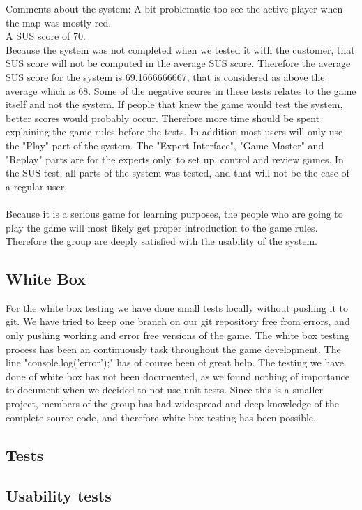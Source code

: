 Comments about the system: A bit problematic too see the active player when the map was mostly red.\\
A SUS score of 70.\\

Because the system was not completed when we tested it with the customer, that SUS score will not be computed in the average SUS score. Therefore the average SUS score for the system is 69.1666666667, that is considered as above the average which is 68. Some of the negative scores in these tests relates to the game itself and not the system. If people that knew the game would test the system, better scores would probably occur. Therefore more time should be spent explaining the game rules before the tests. In addition most users will only use the "Play" part of the system. The "Expert Interface", "Game Master" and "Replay" parts are for the experts only, to set up, control and review games. In the SUS test, all parts of the system was tested, and that will not be the case of a regular user.\\
\\
Because it is a serious game for learning purposes, the people who are going to play the game will most likely get proper introduction to the game rules. Therefore the group are deeply satisfied with the usability of the system. 
\subsection{White Box}
For the white box testing we have done small tests locally without pushing it to git. We have tried to keep one branch on our git repository free from errors, and only pushing working and error free versions of the game. The white box testing process has been an continuously task throughout the game development. The line "console.log('error');" has of course been of great help. The testing we have done of white box  has not been documented, as we found nothing of importance to document when we decided to not use unit tests. Since this is a smaller project, members of the group has had widespread and deep knowledge of the complete source code, and therefore white box testing has been possible.


\subsection{Tests}




\subsection{Usability tests}


